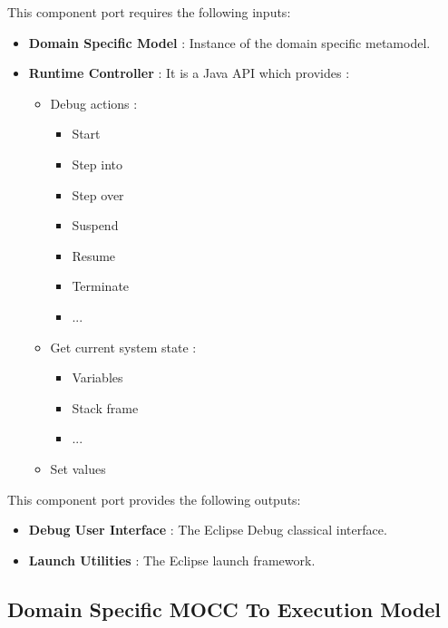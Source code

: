 \documentclass{gemoc} %
\begin{document}
This component port requires the following inputs:
\begin{itemize}
  \item \textbf{Domain Specific Model} :
Instance of the domain specific metamodel.
  \item \textbf{Runtime Controller} :
It is a Java API which provides :
\begin{itemize}
\item Debug actions :
\begin{itemize}
\item Start
\item Step into
\item Step over
\item Suspend
\item Resume
\item Terminate
\item ...
\end{itemize}
\item Get current system state :
\begin{itemize}
\item Variables
\item Stack frame
\item ...
\end{itemize}
\item Set values
\end{itemize}
\end{itemize}

This component port provides the following outputs:
\begin{itemize}
  \item \textbf{Debug User Interface} :
The Eclipse Debug classical interface.
  \item \textbf{Launch Utilities} :
The Eclipse launch framework.
\end{itemize}


\subsection{Domain Specific MOCC To Execution Model}
\end{document}
